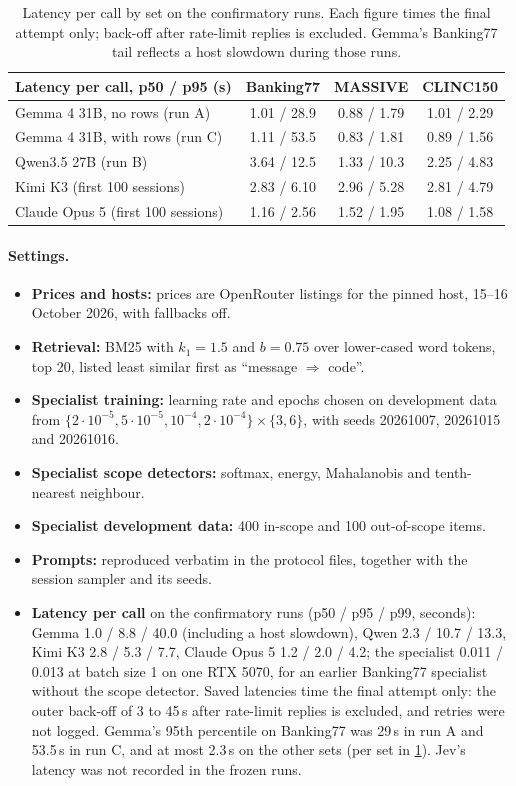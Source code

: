 \documentclass[11pt]{article}
\begin{document}
\begin{table}[t]
\centering\small
\begin{tabular}{@{}lccc@{}}
\toprule
Latency per call, p50 / p95 (s) & Banking77 & MASSIVE & CLINC150 \\
\midrule
Gemma 4 31B, no rows (run A) & 1.01 / 28.9 & 0.88 / 1.79 & 1.01 / 2.29 \\
Gemma 4 31B, with rows (run C) & 1.11 / 53.5 & 0.83 / 1.81 & 0.89 / 1.56 \\
Qwen3.5 27B (run B) & 3.64 / 12.5 & 1.33 / 10.3 & 2.25 / 4.83 \\
Kimi K3 (first 100 sessions) & 2.83 / 6.10 & 2.96 / 5.28 & 2.81 / 4.79 \\
Claude Opus 5 (first 100 sessions) & 1.16 / 2.56 & 1.52 / 1.95 & 1.08 / 1.58 \\
\bottomrule
\end{tabular}
\caption{Latency per call by set on the confirmatory runs. Each figure times the final attempt only; back-off after rate-limit replies is excluded. Gemma's Banking77 tail reflects a host slowdown during those runs.}
\label{tab:latency}
\end{table}

\paragraph{Settings.}
\begin{itemize}
  \item \textbf{Prices and hosts:} prices are OpenRouter listings for the pinned host, 15--16 October 2026, with fallbacks off.
  \item \textbf{Retrieval:} BM25 with $k_1=1.5$ and $b=0.75$ over lower-cased word tokens, top 20, listed least similar first as ``message $\Rightarrow$ code''.
  \item \textbf{Specialist training:} learning rate and epochs chosen on development data from $\{2\cdot10^{-5},5\cdot10^{-5},10^{-4},2\cdot10^{-4}\}\times\{3,6\}$, with seeds 20261007, 20261015 and 20261016.
  \item \textbf{Specialist scope detectors:} softmax, energy, Mahalanobis and tenth-nearest neighbour.
  \item \textbf{Specialist development data:} 400 in-scope and 100 out-of-scope items.
  \item \textbf{Prompts:} reproduced verbatim in the protocol files, together with the session sampler and its seeds.
  \item \textbf{Latency per call} on the confirmatory runs (p50 / p95 / p99, seconds): Gemma 1.0 / 8.8 / 40.0 (including a host slowdown), Qwen 2.3 / 10.7 / 13.3, Kimi K3 2.8 / 5.3 / 7.7, Claude Opus 5 1.2 / 2.0 / 4.2; the specialist 0.011 / 0.013 at batch size 1 on one RTX 5070, for an earlier Banking77 specialist without the scope detector. Saved latencies time the final attempt only: the outer back-off of 3 to 45\,s after rate-limit replies is excluded, and retries were not logged. Gemma's 95th percentile on Banking77 was 29\,s in run A and 53.5\,s in run C, and at most 2.3\,s on the other sets (per set in \cref{tab:latency}). Jev's latency was not recorded in the frozen runs.
\end{itemize}
\end{document}
